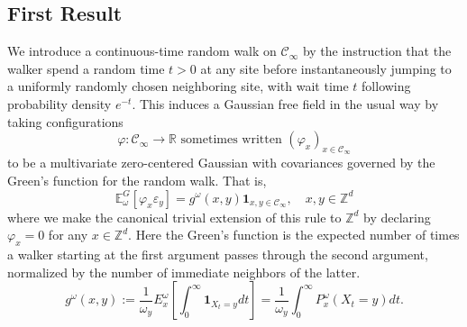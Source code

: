 \documentclass[11pt,letterpaper]{article}
\newcommand{\LP}{\left(}
\newcommand{\RP}{\right)}
\newcommand{\mc}[1]{\mathcal{#1}}
\newcommand{\R}{\mathbb{R}}
\newcommand{\E}{\mathbb{E}}
\newcommand{\Z}{\mathbb{Z}}
\begin{document}
\subsection{First Result}
We introduce a continuous-time random walk on $\mc{C}_\infty$ by the instruction that the walker spend a random time $t > 0$ at any site before instantaneously jumping to a uniformly randomly chosen neighboring site, with wait time $t$ following probability density $e^{-t}$. This induces a Gaussian free field in the usual way by taking configurations \begin{equation}
\varphi: \mc{C}_\infty \to \R \mbox{ sometimes written } \LP \varphi_x \RP_{x \in \mc{C}_\infty}
\end{equation}
to be a multivariate zero-centered Gaussian with covariances governed by the Green's function for the random walk. That is, \begin{equation}
\E_\omega^G [\varphi_x \varepsilon_y] = g^\omega(x, y) \mathbf{1}_{x, y \in \mc{C}_\infty}, \quad x, y \in \Z^d
\end{equation}
where we make the canonical trivial extension of this rule to $\Z^d$ by declaring $\varphi_x = 0$ for any $x \in \Z^d$. Here the Green's function is the expected number of times a walker starting at the first argument passes through the second argument, normalized by the number of immediate neighbors of the latter. \begin{equation}
g^\omega(x, y) := \frac{1}{\omega_y} E_x^\omega \left[ \int_0^\infty \mathbf{1}_{X_t = y} dt \right] = \frac{1}{\omega_y} \int_0^\infty P_x^\omega (X_t = y) dt.
\end{equation}



\end{document}
